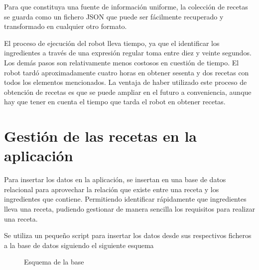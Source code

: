 Para que constituya una fuente de información uniforme, la colección de recetas se guarda como un fichero \gls{JSON} que puede ser fácilmente recuperado y transformado en cualquier otro formato.

El proceso de ejecución del robot lleva tiempo, ya que el identificar los ingredientes a través de una expresión regular toma entre diez y veinte segundos. Los demás pasos son relativamente menos costosos en cuestión de tiempo. El robot tardó aproximadamente cuatro horas en obtener sesenta y dos recetas con todos los elementos mencionados. La ventaja de haber utilizado este proceso de obtención de recetas es que se puede ampliar en el futuro a conveniencia, aunque hay que tener en cuenta el tiempo que tarda el robot en obtener recetas.

\newpage
\section{Gestión de las recetas en la aplicación}

Para insertar los datos en la aplicación, se insertan en una base de datos relacional para aprovechar la relación que existe entre una receta y los ingredientes que contiene. Permitiendo identificar rápidamente que ingredientes lleva una receta, pudiendo gestionar de manera sencilla los requisitos para realizar una receta. 

Se utiliza un pequeño \gls{script} para insertar los datos desde sus respectivos ficheros a la base de datos siguiendo el siguiente esquema
\begin{figure}[h!]
    \centering
    \caption{Esquema de la \gls{base}}
    \label{fig:scheme}
\end{figure}

